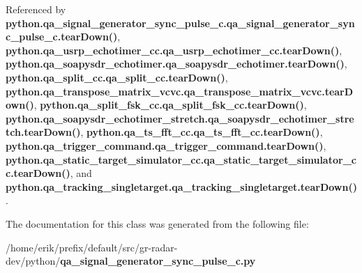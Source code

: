 Referenced by {\bf python.\+qa\+\_\+signal\+\_\+generator\+\_\+sync\+\_\+pulse\+\_\+c.\+qa\+\_\+signal\+\_\+generator\+\_\+sync\+\_\+pulse\+\_\+c.\+tear\+Down()}, {\bf python.\+qa\+\_\+usrp\+\_\+echotimer\+\_\+cc.\+qa\+\_\+usrp\+\_\+echotimer\+\_\+cc.\+tear\+Down()}, {\bf python.\+qa\+\_\+soapysdr\+\_\+echotimer.\+qa\+\_\+soapysdr\+\_\+echotimer.\+tear\+Down()}, {\bf python.\+qa\+\_\+split\+\_\+cc.\+qa\+\_\+split\+\_\+cc.\+tear\+Down()}, {\bf python.\+qa\+\_\+transpose\+\_\+matrix\+\_\+vcvc.\+qa\+\_\+transpose\+\_\+matrix\+\_\+vcvc.\+tear\+Down()}, {\bf python.\+qa\+\_\+split\+\_\+fsk\+\_\+cc.\+qa\+\_\+split\+\_\+fsk\+\_\+cc.\+tear\+Down()}, {\bf python.\+qa\+\_\+soapysdr\+\_\+echotimer\+\_\+stretch.\+qa\+\_\+soapysdr\+\_\+echotimer\+\_\+stretch.\+tear\+Down()}, {\bf python.\+qa\+\_\+ts\+\_\+fft\+\_\+cc.\+qa\+\_\+ts\+\_\+fft\+\_\+cc.\+tear\+Down()}, {\bf python.\+qa\+\_\+trigger\+\_\+command.\+qa\+\_\+trigger\+\_\+command.\+tear\+Down()}, {\bf python.\+qa\+\_\+static\+\_\+target\+\_\+simulator\+\_\+cc.\+qa\+\_\+static\+\_\+target\+\_\+simulator\+\_\+cc.\+tear\+Down()}, and {\bf python.\+qa\+\_\+tracking\+\_\+singletarget.\+qa\+\_\+tracking\+\_\+singletarget.\+tear\+Down()}.



The documentation for this class was generated from the following file\+:\begin{DoxyCompactItemize}
\item 
/home/erik/prefix/default/src/gr-\/radar-\/dev/python/{\bf qa\+\_\+signal\+\_\+generator\+\_\+sync\+\_\+pulse\+\_\+c.\+py}\end{DoxyCompactItemize}
